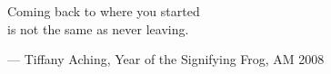 \begin{flushright}
\begin{hangleftquote}{\QENOpen}{\QENClose}
Coming back to where you started\\
is not the same as never leaving.
\end{hangleftquote}
\par\smallskip
\normalfont — Tiffany Aching, Year of the Signifying Frog, AM 2008
\end{flushright}
